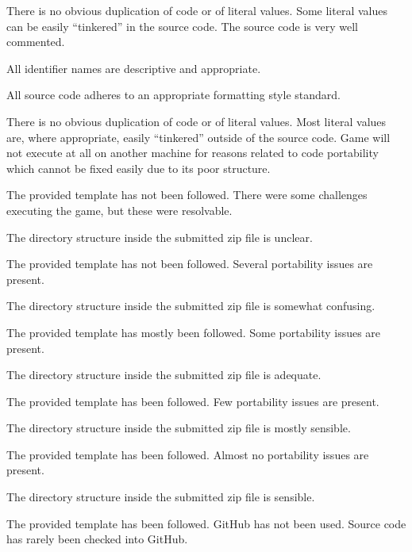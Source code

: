 \documentclass{../fal_assignment}
\begin{document}
\begin{markingrubric}
             \par There is no obvious duplication of code or of literal values. Some literal values can be easily ``tinkered'' in the source code. 
        \grade The source code is very well commented.
            \par All identifier names are descriptive and appropriate.
            \par All source code adheres to an appropriate formatting style standard.
             \par There is no obvious duplication of code or of literal values. Most literal values are, where appropriate, easily ``tinkered'' outside of the source code.  
%
        \grade\fail Game will not execute at all on another machine for reasons related to code portability which cannot be fixed easily due to its poor structure.
            \par The provided template has not been followed.
        \grade There were some challenges executing the game, but these were resolvable.
            \par The directory structure inside the submitted zip file is unclear.
            \par The provided template has not been followed.
        \grade Several portability issues are present.
            \par The directory structure inside the submitted zip file is somewhat confusing.
            \par The provided template has mostly been followed.
        \grade Some portability issues are present.
            \par The directory structure inside the submitted zip file is adequate.
            \par The provided template has been followed.
        \grade Few portability issues are present.
            \par The directory structure inside the submitted zip file is mostly sensible.
            \par The provided template has been followed.
        \grade Almost no portability issues are present.
            \par The directory structure inside the submitted zip file is sensible.
            \par The provided template has been followed.
%
        \grade\fail GitHub has not been used.
        \grade Source code has rarely been checked into GitHub.

\end{markingrubric}
\end{document}
